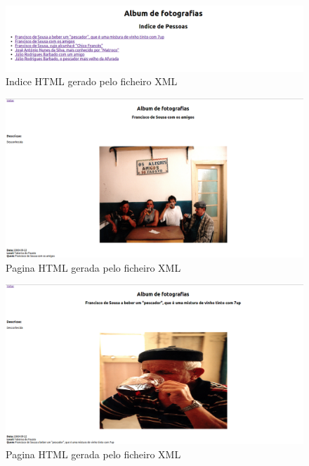 \begin{figure}[H]
\centering
\includegraphics[width=15cm]{anexos/2-1/Exemplo2/Screenshots/indice.png}
\caption{Indice HTML gerado pelo ficheiro XML}
\end{figure}

\label{seq:anex-museu-test-out02-02}


\begin{figure}[H]
\centering
\includegraphics[width=15cm]{anexos/2-1/Exemplo2/Screenshots/pag1.png}
\caption{Pagina HTML gerada pelo ficheiro XML}
\end{figure}

\label{seq:anex-museu-test-out02-03}


\begin{figure}[H]
\centering
\includegraphics[width=15cm]{anexos/2-1/Exemplo2/Screenshots/pag2.png}
\caption{Pagina HTML gerada pelo ficheiro XML}
\end{figure}


